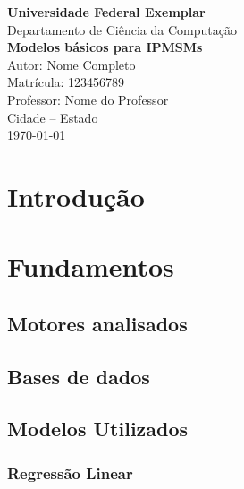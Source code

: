 \documentclass[12pt]{article}
\begin{document}
\begin{titlepage}
    \centering
    \vspace*{3cm}
    {\Large\textbf{Universidade Federal Exemplar}}\\[0.3cm]
    {\large Departamento de Ciência da Computação}\\[3cm]
    
    {\huge\bfseries Modelos básicos para IPMSMs}\\[1.5cm]
    
    {\large Autor: Nome Completo}\\[0.5cm]
    {\large Matrícula: 123456789}\\[0.5cm]
    {\large Professor: Nome do Professor}\\[4cm]
    
    {\large Cidade – Estado}\\
    {\large \today}
\end{titlepage}

\tableofcontents
\newpage

\section{Introdução}


\section{Fundamentos}

\subsection{Motores analisados}

\subsection{Bases de dados}

\subsection{Modelos Utilizados}
\subsubsection{Regressão Linear}
\end{document}
